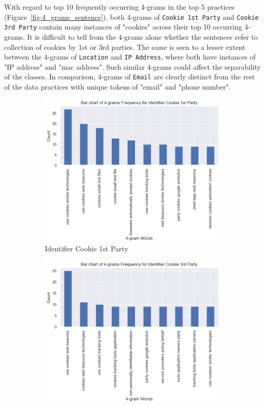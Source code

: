 With regard to top 10 frequently occurring 4-grams in the top 5 practices (Figure~\ref{fig:4_grams_sentence}), both 4-grams of \texttt{Cookie 1st Party} and \texttt{Cookie 3rd Party} contain many instances of "cookies" across their top 10 occurring 4-grams. It is difficult to tell from the 4-grams alone whether the sentences refer to collection of cookies by 1st or 3rd parties. The same is seen to a lesser extent between the 4-grams of \texttt{Location} and \texttt{IP Address}, where both have instances of "IP address" and "mac address". Such similar 4-grams could affect the separability of the classes. In comparison, 4-grams of \texttt{Email} are clearly distinct from the rest of the data practices with unique tokens of "email" and "phone number". 

\begin{figure}[!ht]
	\begin{subfigure}[t]{.5\textwidth}
	  \centering
	  \includegraphics[width=\linewidth]{figures/4_grams_cookie_1stParty.png}
	  \caption{Identifier Cookie 1st Party}
	\end{subfigure}
	\hfill
	\begin{subfigure}[t]{.5\textwidth}
	  \centering
	  \includegraphics[width=\linewidth]{figures/4_grams_cookie_3rdParty.png}

\end{subfigure}
\end{figure}
